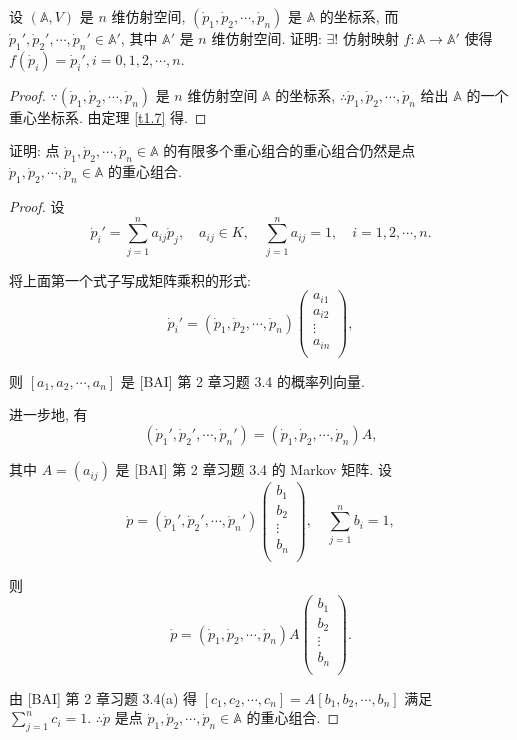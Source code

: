\documentclass{ctexart}
\begin{document}
\begin{exercise}%
    设 $(\mathbb{A},V)$ 是 $n$ 维仿射空间, $(\dot{p}_1,\dot{p}_2,\cdots,\dot{p}_n)$ 是 $\mathbb{A}$ 的坐标系, 而 $\dot{p}_1',\dot{p}_2',\cdots,\dot{p}_n'\in\mathbb{A}'$, 其中 $\mathbb{A}'$ 是 $n$ 维仿射空间. 证明: $\exists!$ 仿射映射 $f:\mathbb{A}\to\mathbb{A}'$ 使得 $f(\dot{p}_i)=\dot{p}_i',i=0,1,2,\cdots,n$.
\end{exercise}
\begin{proof}
    $\because(\dot{p}_1,\dot{p}_2,\cdots,\dot{p}_n)$ 是 $n$ 维仿射空间 $\mathbb{A}$ 的坐标系, $\therefore\dot{p}_1,\dot{p}_2,\cdots,\dot{p}_n$ 给出 $\mathbb{A}$ 的一个重心坐标系. 由定理 \ref{t1.7} 得.
\end{proof}
\begin{exercise}%
    证明: 点 $\dot{p}_1,\dot{p}_2,\cdots,\dot{p}_n\in\mathbb{A}$ 的有限多个重心组合的重心组合仍然是点 $\dot{p}_1,\dot{p}_2,\cdots,\dot{p}_n\in\mathbb{A}$ 的重心组合.
\end{exercise}
\begin{proof}
    设
    \[\dot{p}_i'=\sum\limits_{j=1}^na_{ij}\dot{p}_j,\quad a_{ij}\in K,\quad\sum\limits_{j=1}^na_{ij}=1,\quad i=1,2,\cdots,n.\]

    将上面第一个式子写成矩阵乘积的形式:
    \[\dot{p}_i'=(\dot{p}_1,\dot{p}_2,\cdots,\dot{p}_n)\begin{pmatrix}
        a_{i1} \\
        a_{i2} \\
        \vdots \\
        a_{in} \\
    \end{pmatrix},\]

    则 $[a_1,a_2,\cdots,a_n]$ 是 [BAI] 第 2 章习题 3.4 的概率列向量.

    进一步地, 有
    \[(\dot{p}_1',\dot{p}_2',\cdots,\dot{p}_n')=(\dot{p}_1,\dot{p}_2,\cdots,\dot{p}_n)A,\]

    其中 $A=(a_{ij})$ 是 [BAI] 第 2 章习题 3.4 的 Markov 矩阵. 设
    \[\dot{p}=(\dot{p}_1',\dot{p}_2',\cdots,\dot{p}_n')\begin{pmatrix}
        b_1 \\
        b_2 \\
        \vdots \\
        b_n \\
    \end{pmatrix},\quad\sum\limits_{j=1}^nb_i=1,\]

    则
    \[\dot{p}=(\dot{p}_1,\dot{p}_2,\cdots,\dot{p}_n)A\begin{pmatrix}
        b_1 \\
        b_2 \\
        \vdots \\
        b_n \\
    \end{pmatrix}.\]

    由 [BAI] 第 2 章习题 3.4(a) 得 $[c_1,c_2,\cdots,c_n]=A[b_1,b_2,\cdots,b_n]$ 满足 $\sum\limits_{j=1}^nc_i=1$. $\therefore\dot{p}$ 是点 $\dot{p}_1,\dot{p}_2,\cdots,\dot{p}_n\in\mathbb{A}$ 的重心组合.
\end{proof}
\end{document}
